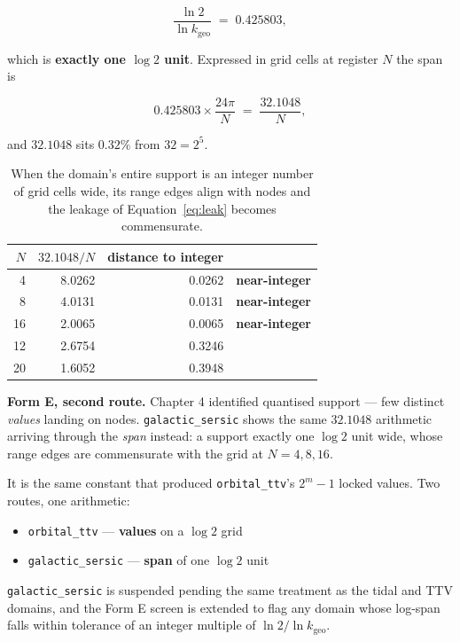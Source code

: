 \documentclass[11pt, letterpaper, openany]{book}
\newcommand{\kgeo}{k_{\mathrm{geo}}}
\begin{document}
\[
\frac{\ln 2}{\ln \kgeo} \;=\; 0.425803 ,
\]

which is \textbf{exactly one $\log 2$ unit}. Expressed in grid cells at register $N$ the span is

\begin{equation}
0.425803 \times \frac{24\pi}{N} \;=\; \frac{32.1048}{N},
\end{equation}

and $32.1048$ sits $0.32\%$ from $32 = 2^5$.

\begin{table}[H]
\centering
\small
\begin{tabular}{@{}rrrl@{}}
\toprule
$N$ & $32.1048/N$ & \textbf{distance to integer} & \\
\midrule
4 & 8.0262 & 0.0262 & \textbf{near-integer} \\
8 & 4.0131 & 0.0131 & \textbf{near-integer} \\
16 & 2.0065 & 0.0065 & \textbf{near-integer} \\
12 & 2.6754 & 0.3246 & \\
20 & 1.6052 & 0.3948 & \\
\bottomrule
\end{tabular}
\caption{When the domain's entire support is an integer number of grid cells wide, its range
edges align with nodes and the leakage of Equation~\ref{eq:leak} becomes commensurate.}
\end{table}

\begin{formbox}
\textbf{Form E, second route.} Chapter 4 identified quantised support --- few distinct
\emph{values} landing on nodes. \texttt{galactic\_sersic} shows the same $32.1048$ arithmetic
arriving through the \emph{span} instead: a support exactly one $\log 2$ unit wide, whose range
edges are commensurate with the grid at $N = 4, 8, 16$.

\medskip
\noindent It is the same constant that produced \texttt{orbital\_ttv}'s $2^m - 1$ locked values.
Two routes, one arithmetic:
\begin{itemize}
    \item \texttt{orbital\_ttv} --- \textbf{values} on a $\log 2$ grid
    \item \texttt{galactic\_sersic} --- \textbf{span} of one $\log 2$ unit
\end{itemize}
\end{formbox}

\texttt{galactic\_sersic} is suspended pending the same treatment as the tidal and TTV domains,
and the Form E screen is extended to flag any domain whose log-span falls within tolerance of an
integer multiple of $\ln 2 / \ln \kgeo$.
\end{document}
